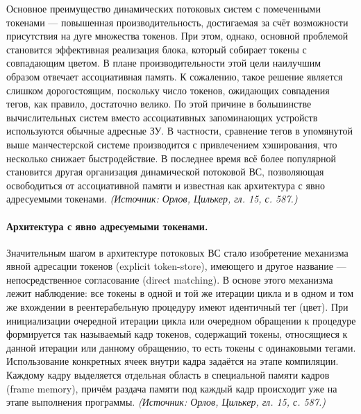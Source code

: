 \documentclass[a4paper,12pt]{article}
\begin{document}
Основное преимущество динамических потоковых систем с помеченными токенами — повышенная производительность, достигаемая за счёт возможности присутствия на дуге множества токенов. При этом, однако, основной проблемой становится эффективная реализация блока, который собирает токены с совпадающим цветом. В плане производительности этой цели наилучшим образом отвечает ассоциативная память. К сожалению, такое решение является слишком дорогостоящим, поскольку число токенов, ожидающих совпадения тегов, как правило, достаточно велико. По этой причине в большинстве вычислительных систем вместо ассоциативных запоминающих устройств используются обычные адресные ЗУ. В частности, сравнение тегов в упомянутой выше манчестерской системе производится с привлечением хэширования, что несколько снижает быстродействие. В последнее время всё более популярной становится другая организация динамической потоковой ВС, позволяющая освободиться от ассоциативной памяти и известная как архитектура с явно адресуемыми токенами.
\textit{(Источник: Орлов, Цилькер, гл. 15, с. 587.)}

\paragraph{Архитектура с явно адресуемыми токенами.}
Значительным шагом в архитектуре потоковых ВС стало изобретение механизма явной адресации токенов (explicit token-store), имеющего и другое название — непосредственное согласование (direct matching). В основе этого механизма лежит наблюдение: все токены в одной и той же итерации цикла и в одном и том же вхождении в реентерабельную процедуру имеют идентичный тег (цвет). При инициализации очередной итерации цикла или очередном обращении к процедуре формируется так называемый кадр токенов, содержащий токены, относящиеся к данной итерации или данному обращению, то есть токены с одинаковыми тегами. Использование конкретных ячеек внутри кадра задаётся на этапе компиляции. Каждому кадру выделяется отдельная область в специальной памяти кадров (frame memory), причём раздача памяти под каждый кадр происходит уже на этапе выполнения программы.
\textit{(Источник: Орлов, Цилькер, гл. 15, с. 587.)}
\end{document}
